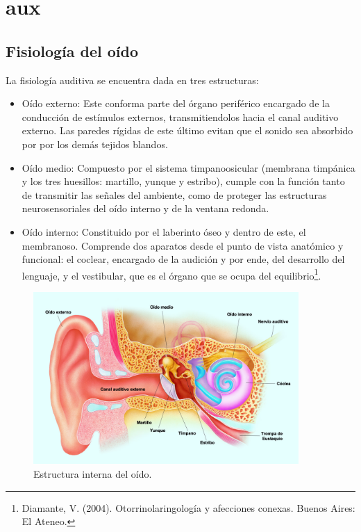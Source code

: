 \documentclass[a4paper]{article}
\begin{document}
\tableofcontents
\newpage
\section{aux}

\subsection{Fisiología del oído}

La fisiología auditiva se encuentra dada en tres estructuras:
\begin{itemize}
	\item Oído externo:
	Este conforma parte del órgano periférico encargado de la conducción de estímulos externos, transmitiendolos hacia el canal auditivo externo. Las paredes rígidas de este último evitan que el sonido sea absorbido por por los demás tejidos blandos.
	\item Oído medio:
	Compuesto por el sistema timpanoosicular (membrana timpánica y los tres huesillos: martillo, yunque y estribo), cumple con la función tanto de transmitir las señales del ambiente, como de proteger las estructuras neurosensoriales del oído interno y de la ventana redonda.
	\item Oído interno:
	Constituido por el laberinto óseo y dentro de este, el membranoso. Comprende dos aparatos desde el punto de vista anatómico y funcional: el coclear, encargado de la audición y por ende, del desarrollo del lenguaje, y el vestibular, que es el órgano que se ocupa del equilibrio\footnote{Diamante, V. (2004). Otorrinolaringología y afecciones conexas. Buenos Aires: El Ateneo.}.
\end{itemize}

\begin{figure}[H]
\centering
	\includegraphics[width=0.9\textwidth]{Imagenes/Partes-del-oido.png}
	\caption{Estructura interna del oído.}
	\label{fig:oido}
\end{figure}
\end{document}
